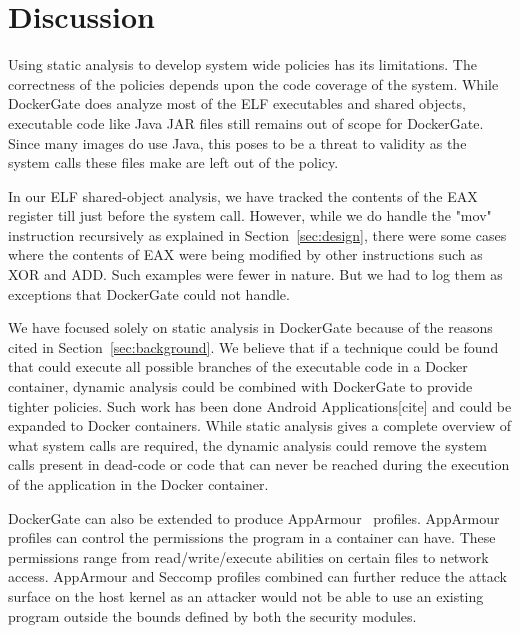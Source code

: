 \section{Discussion}
\label{sec:discussion}
Using static analysis to develop system wide policies has its limitations. The correctness of the policies depends upon the code coverage of the system. While DockerGate does analyze most of the ELF executables and shared objects, executable code like Java JAR files still remains out of scope for DockerGate. Since many images do use Java, this poses to be a threat to validity as the system calls these files make are left out of the policy.

In our ELF shared-object analysis, we have tracked the contents of the EAX register till just before the system call. However, while we do handle the "mov" instruction recursively as explained in Section~\ref{sec:design}, there were some cases where the contents of EAX were being modified by other instructions such as XOR and ADD. Such examples were fewer in nature. But we had to log them as exceptions that DockerGate could not handle.

We have focused solely on static analysis in DockerGate because of the reasons cited in 
Section~\ref{sec:background}. We believe that if a technique could be found that could execute all possible branches of the executable code in a Docker container, dynamic analysis could be combined with DockerGate to provide tighter policies. Such work has been done Android Applications[cite] and could be expanded to Docker containers. While static analysis gives a complete overview of what system calls are required, the dynamic analysis could remove the system calls present in dead-code or code that can never be reached during the execution of the application in the Docker container.

DockerGate can also be extended to produce AppArmour~\cite{apparmor} profiles. AppArmour profiles can control the permissions the program in a container can have. These permissions range from read/write/execute abilities on certain files to network access. AppArmour and Seccomp profiles combined can further reduce the attack surface on the host kernel as an attacker would not be able to use an existing program outside the bounds defined by both the security modules.
